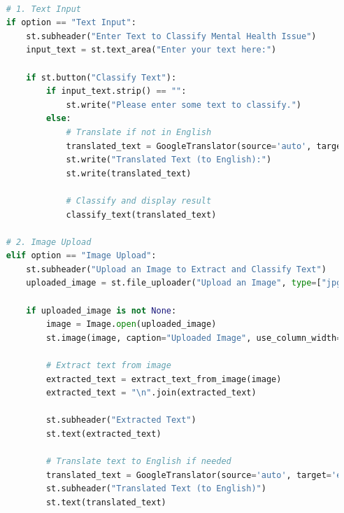     \begin{tcolorbox}[colback=gray!5!white, colframe=gray!80!black, boxrule=0.5pt, title=Main Streamlit Application Logic]
        \begin{lstlisting}[language=Python]

    # 1. Text Input
    if option == "Text Input":
        st.subheader("Enter Text to Classify Mental Health Issue")
        input_text = st.text_area("Enter your text here:")

        if st.button("Classify Text"):
            if input_text.strip() == "":
                st.write("Please enter some text to classify.")
            else:
                # Translate if not in English
                translated_text = GoogleTranslator(source='auto', target='en').translate(input_text)
                st.write("Translated Text (to English):")
                st.write(translated_text)

                # Classify and display result
                classify_text(translated_text)

    # 2. Image Upload
    elif option == "Image Upload":
        st.subheader("Upload an Image to Extract and Classify Text")
        uploaded_image = st.file_uploader("Upload an Image", type=["jpg", "jpeg", "png", "webp", "bmp", "tiff"])

        if uploaded_image is not None:
            image = Image.open(uploaded_image)
            st.image(image, caption="Uploaded Image", use_column_width=True)

            # Extract text from image
            extracted_text = extract_text_from_image(image)
            extracted_text = "\n".join(extracted_text)

            st.subheader("Extracted Text")
            st.text(extracted_text)
        
            # Translate text to English if needed
            translated_text = GoogleTranslator(source='auto', target='en').translate(extracted_text)
            st.subheader("Translated Text (to English)")
            st.text(translated_text)
        \end{lstlisting}
    \end{tcolorbox}

